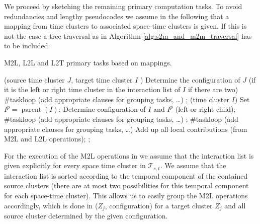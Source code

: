 \documentclass[a4paper,11pt]{article}
\theoremstyle{plain}
\theoremstyle{definition}
\theoremstyle{remark}
\DeclareMathOperator{\parent}{parent}
\begin{document}
We proceed by sketching the remaining primary computation tasks. To avoid redundancies and lengthy pseudocodes we assume in the following that a mapping from time clusters to associated space-time clusters is given. If this is not the case a tree traversal as in Algorithm \ref{alg:s2m_and_m2m_traversal} has to be included.

\begin{algorithm}
  \caption{M2L, L2L and L2T primary tasks based on mappings.} \label{alg:m2l_l2l_l2t_mapping}
  \begin{algorithmic}[1] 
    (source time cluster $J$,
    \FunctionContinue target time cluster $I$ )
      \State Determine the configuration of $J$ (if it is the left or right time cluster 
      \Statexindent in the interaction list of $I$ if there are two)
      \State \#taskloop (add appropriate clauses for grouping tasks, \ldots)
        \State {};
      \EndFor
    \EndFunction
    \Statex
    (time cluster $I$)
      \State Set $I^p = \parent(I)$;
      \State Determine configuration of $I$ and $I^p$ (left or right child);
      \State \#taskloop (add appropriate clauses for grouping tasks, \ldots)
        \State {};
      \EndFor
    \EndFunction
    \Statex
    \State \#taskloop (add appropriate clauses for grouping tasks, \ldots)
        \State Add up all local contributions (from M2L and L2L operations);
        \State {};
      \EndFor
    \EndFunction
  \end{algorithmic}
\end{algorithm}

For the execution of the M2L operations in  we assume that the interaction list is given explicitly for every space time cluster in $\mathcal{T}_{s,t}$. We assume that the interaction list is sorted according to the temporal component of the contained source clusters (there are at most two possibilities for this temporal component for each space-time cluster). This allows us to easily group the M2L operations accordingly, which is done in ($Z_j$, configuration) for a target cluster $Z_j$ and all source cluster determined by the given configuration.
\end{document}
